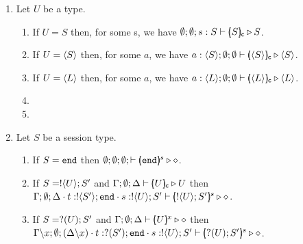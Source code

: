 \begin{proposition}
	\label{app:characteristic_inhabit}
	\begin{enumerate}
		\item	Let $U$ be a type. 
		\begin{enumerate}
			\item	If $U = S$ then, for some s, we have $\emptyset; \emptyset; s: S \vdash [\!\!(S)\!\!]_{\mathsf{c}} \triangleright S$.
	
			\item	If $U = \langle S \rangle$ then, for some $a$, we have $a: \langle S \rangle; \emptyset; \emptyset \vdash [\!\!(\langle S \rangle)\!\!]_{\mathsf{c}} \triangleright \langle S \rangle$.
	
			\item	If $U = \langle L \rangle$ then, for some $a$, we have $a: \langle L \rangle; \emptyset; \emptyset \vdash [\!\!(\langle L \rangle)\!\!]_{\mathsf{c}} \triangleright \langle L \rangle$.

			\item	{}

			\item	{}

		\end{enumerate}

		\item	Let $S$ be a session type. 
		\begin{enumerate}
			\item	If $S = \mathtt{end}$ then $\emptyset; \emptyset; \emptyset; \vdash [\!\!(\mathtt{end})\!\!]^{s} \triangleright \diamond$.
	
			\item	If $S = ! \langle U \rangle ; S'$ and  
					$\Gamma; \emptyset; \Delta \vdash [\!\!(U)\!\!]_{\mathsf{c}} \triangleright U$ then \\
					$\Gamma; \emptyset; \Delta \cdot t: ! \langle S' \rangle ; \mathtt{end} \cdot s: ! \langle U \rangle ; S' \vdash [\!\!(! \langle U \rangle ; S')\!\!]^{s} \triangleright \diamond$.
	
			\item	If $S = ? (U) ; S'$ and
					$\Gamma; \emptyset; \Delta \vdash [\!\!(U)\!\!]^{x}  \triangleright \diamond$ then \\
					$\Gamma \backslash x; \emptyset; (\Delta\backslash x) \cdot t: ? (S') ; \mathtt{end} \cdot s: ! \langle U \rangle ; S' \vdash [\!\!(? (U) ; S')\!\!]^{s} \triangleright \diamond$.
	

\end{enumerate}
\end{enumerate}
\end{proposition}
